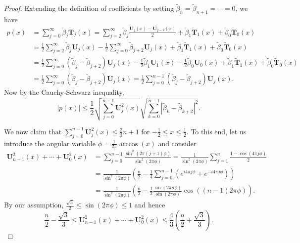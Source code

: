 \documentclass[letterpaper,onecolumn,11pt,accepted=2026-02-14]{quantumarticle}
\newcommand{\abs}[1]{\left\lvert#1\right\rvert}
\theoremstyle{remark}
\theoremstyle{plain}
\begin{document}
\begin{proof}
Extending the definition of coefficients by setting $\widetilde{\beta}_{n}=\widetilde{\beta}_{n+1}=\cdots=0$, we have
\begin{equation}
\begin{aligned}
    p(x)&=\sum_{j=0}^{\infty}\widetilde{\beta}_j\widetilde{\mathbf{T}}_j(x)
    =\sum_{j=2}^{\infty}\widetilde{\beta}_j\frac{\mathbf{U}_j(x)-\mathbf{U}_{j-2}(x)}{2}
    +\widetilde{\beta}_1\widetilde{\mathbf{T}}_1(x)
    +\widetilde{\beta}_0\widetilde{\mathbf{T}}_0(x)\\
    &=\frac{1}{2}\sum_{j=2}^{\infty}\widetilde{\beta}_j\mathbf{U}_j(x)
    -\frac{1}{2}\sum_{j=0}^{\infty}\widetilde{\beta}_{j+2}\mathbf{U}_j(x)
    +\widetilde{\beta}_1\widetilde{\mathbf{T}}_1(x)
    +\widetilde{\beta}_0\widetilde{\mathbf{T}}_0(x)\\
    &=\frac{1}{2}\sum_{j=0}^{\infty}\left(\widetilde{\beta}_j-\widetilde{\beta}_{j+2}\right)\mathbf{U}_j(x)
    -\frac{1}{2}\widetilde{\beta}_1\mathbf{U}_1(x)
    -\frac{1}{2}\widetilde{\beta}_0\mathbf{U}_0(x)
    +\widetilde{\beta}_1\widetilde{\mathbf{T}}_1(x)
    +\widetilde{\beta}_0\widetilde{\mathbf{T}}_0(x)\\
    &=\frac{1}{2}\sum_{j=0}^{\infty}\left(\widetilde{\beta}_j-\widetilde{\beta}_{j+2}\right)\mathbf{U}_j(x)
    =\frac{1}{2}\sum_{j=0}^{n-1}\left(\widetilde{\beta}_j-\widetilde{\beta}_{j+2}\right)\mathbf{U}_j(x).
\end{aligned}
\end{equation}
Now by the Cauchy-Schwarz inequality,
\begin{equation}
    \abs{p(x)}\leq\frac{1}{2}\sqrt{\sum_{j=0}^{n-1}\mathbf{U}_j^2(x)}
    \sqrt{\sum_{k=0}^{n-1}|\widetilde{\beta}_k-\widetilde{\beta}_{k+2}|^2}.
\end{equation}

We now claim that $\sum_{j=0}^{n-1}\mathbf{U}_j^2(x)\leq\frac{2}{3}n+1$ for $-\frac{1}{2}\leq x\leq\frac{1}{2}$.
To this end, let us introduce the angular variable $\phi=\frac{1}{2\pi}\arccos(x)$ and consider
\begin{equation}
\begin{aligned}
    \mathbf{U}_{n-1}^2\left(x\right)+\cdots+\mathbf{U}_{0}^2\left(x\right)
    &=\sum_{j=0}^{n-1}\frac{\sin^2(2\pi (j+1)\phi)}{\sin^2(2\pi\phi)}
    =
    \frac{1}{{\sin^2(2\pi\phi)}}\sum_{j=1}^{n}\frac{1-\cos(4\pi j\phi)}{2}\\
    &=\frac{1}{{\sin^2(2\pi\phi)}}\left(\frac{n}{2}-\frac{1}{4}\sum_{j=0}^{n-1}\left(e^{i4\pi j\phi}+e^{-i4\pi j\phi}\right)\right)\\
    &=\frac{1}{{\sin^2(2\pi\phi)}}\left(\frac{n}{2}-\frac{1}{2}\frac{\sin(2\pi n\phi)}{\sin(2\pi\phi)}\cos((n-1)2\pi\phi)\right).
\end{aligned}
\end{equation}
By our assumption, $\frac{\sqrt{3}}{2}\leq\sin(2\pi\phi)\leq1$ and hence
\begin{equation}
    \frac{n}{2}-\frac{\sqrt{3}}{3}
    \leq\mathbf{U}_{n-1}^2\left(x\right)+\cdots+\mathbf{U}_{0}^2\left(x\right)
    \leq\frac{4}{3}\left(\frac{n}{2}+\frac{\sqrt{3}}{3}\right).
\end{equation}
\end{proof}
\end{document}
